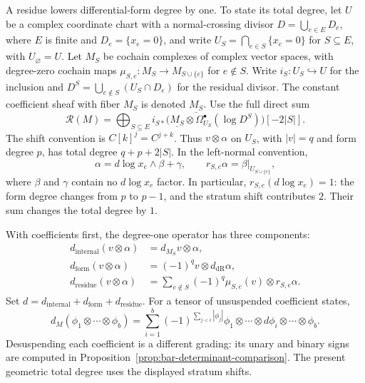 \begin{definition}\label{def:bar-differential-complete}%
\label{def:geometric-bar}\label{def:geometric-bar-definition}\label{def:bar-geometric}%
\label{def:bar-diff-detailed}\label{def:diff-total}%
A residue lowers differential-form degree by one.  To state its total degree,
let $U$ be a complex coordinate chart with a normal-crossing divisor
$D=\bigcup_{e\in E}D_e$, where $E$ is finite and $D_e=\{x_e=0\}$, and write $U_S=\bigcap_{e\in S}\{x_e=0\}$
for $S\subseteq E$, with $U_\varnothing=U$.
Let $M_S$ be cochain complexes of complex vector spaces, with degree-zero cochain maps
$\mu_{S,e}:M_S\to M_{S\cup\{e\}}$ for $e\notin S$.
Write $i_S:U_S\hookrightarrow U$ for the inclusion and
$D^S=\bigcup_{e\notin S}(U_S\cap D_e)$ for the residual divisor.
The constant coefficient sheaf with fiber $M_S$ is denoted $\underline{M_S}$.
Use the full direct sum
\[
\mathcal R(M)=\bigoplus_{S\subseteq E}
 i_{S*}\bigl(\underline{M_S}\otimes\Omega_{U_S}^{\bullet}(\log D^S)\bigr)[-2|S|].
\]
The shift convention is $C[k]^j=C^{j+k}$.
Thus $v\otimes\alpha$ on $U_S$, with $|v|=q$ and form degree $p$, has total degree
$q+p+2|S|$.  In the left-normal convention,
\[
\alpha=d\log x_e\wedge\beta+\gamma,
\qquad r_{S,e}\alpha=\beta|_{U_{S\cup\{e\}}},
\]
where $\beta$ and $\gamma$ contain no $d\log x_e$ factor.  In particular,
$r_{S,e}(d\log x_e)=1$: the form degree changes from $p$ to $p-1$,
and the stratum shift contributes $2$.  Their sum changes the total degree by $1$.

With coefficients first, the degree-one operator has three components:
\begin{align*}
d_{\mathrm{internal}}(v\otimes\alpha)&=d_{M_S}v\otimes\alpha,\\
d_{\mathrm{form}}(v\otimes\alpha)&=(-1)^qv\otimes d_{\mathrm{dR}}\alpha,\\
d_{\mathrm{residue}}(v\otimes\alpha)&=
 \sum_{e\notin S}(-1)^q\mu_{S,e}(v)\otimes r_{S,e}\alpha.
\end{align*}
Set $d=d_{\mathrm{internal}}+d_{\mathrm{form}}+d_{\mathrm{residue}}$.
For a tensor of unsuspended coefficient states,
\[
d_M(\phi_1\otimes\cdots\otimes\phi_b)
=\sum_{i=1}^b(-1)^{\sum_{j<i}|\phi_j|}
 \phi_1\otimes\cdots\otimes d\phi_i\otimes\cdots\otimes\phi_b.
\]
Desuspending each coefficient is a different grading: its unary and binary signs
are computed in Proposition~\ref{prop:bar-determinant-comparison}.
The present geometric total degree uses the displayed stratum shifts.


\end{definition}
